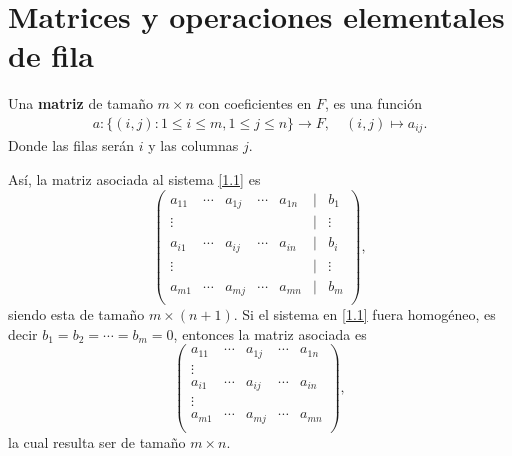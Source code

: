 \documentclass[12pt,a4paper]{book}
\newcommand{\llavesgrande}[1]{\big\{#1\big\}}
\begin{document}
    \section{Matrices y operaciones elementales de fila}
    
    \begin{definicion}[Matriz]
        Una \textbf{matriz} de tamaño $m \times n$ con coeficientes en $F$, es una función
        \begin{align*}
            a : \llavesgrande{(i,j): 1 \leq i \leq m, 1 \leq j \leq n} \to F,\quad (i, j) \mapsto a_{ij}.
        \end{align*}
        Donde las filas serán $i$ y las columnas $j$.
    \end{definicion}
    Así, la matriz asociada al sistema \eqref{1.1} es
    \begin{equation*}
        \begin{pmatrix}
            a_{11} & \dotsi & a_{1j} & \dotsi & a_{1n} & | & b_1\\[3pt]
            \vdots&&&&&| & \vdots\\[3pt]
            a_{i1} & \dotsi & a_{ij} & \dotsi & a_{in} & | & b_i\\[3pt]
            \vdots&&&&&| & \vdots\\[3pt]
            a_{m1} & \dotsi & a_{mj} & \dotsi & a_{mn} & | & b_m\\[3pt]
        \end{pmatrix},
    \end{equation*}
    siendo esta de tamaño $m \times (n + 1)$. Si el sistema en \eqref{1.1} fuera homogéneo, es decir $b_1 = b_2 = \dotsi = b_m = 0$, entonces la matriz asociada es
    \begin{equation*}
        \begin{pmatrix}
            a_{11} & \dotsi & a_{1j} & \dotsi & a_{1n} \\[3pt]
            \vdots&&&&\\[3pt]
            a_{i1} & \dotsi & a_{ij} & \dotsi & a_{in}\\[3pt]
            \vdots&&&&\\[3pt]
            a_{m1} & \dotsi & a_{mj} & \dotsi & a_{mn} \\[3pt]
        \end{pmatrix},
    \end{equation*}
    la cual resulta ser de tamaño $m \times n$.

    \vspace{2.1cm}
    
\end{document}

